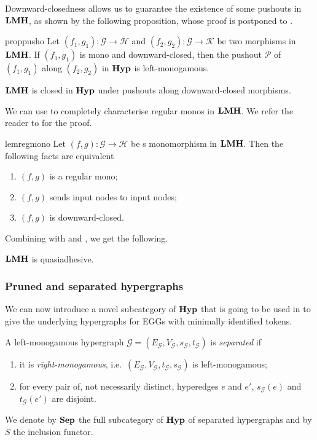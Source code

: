 \documentclass[3p]{elsarticle}
\newcommand{\catname}[1]{\textbf{\textup{#1}}}
\newcommand{\lmo}{\catname{LMH}}
\newcommand{\hyp}{\catname{Hyp}}
\newcommand{\shyp}{\catname{Sep}}
\theoremstyle{remark}
\theoremstyle{definition}
\begin{document}
Downward-closedness allows us to guarantee the existence of some pushouts in $\lmo$, as shown by the following proposition, whose proof is postponed to . 
\begin{restatable}{prop}{pusho}\label{prop:pusho}
Let $(f_1,g_1)\colon \mathcal{G}\to \mathcal{H}$ and $(f_2, g_2)\colon \mathcal{G}\to \mathcal{K}$ be two morphisms in $\lmo$. If $(f_1,g_1)$ is mono and downward-closed, then the pushout $\mathcal{P}$ of $(f_1,g_1)$ along $(f_2, g_2)$ in $\hyp$ is left-monogamous.
\end{restatable}

\begin{cor}\label{cor:pusho}
	$\lmo$ is closed in $\hyp$ under pushouts along downward-closed morphisms.
\end{cor}

We can use  to completely characterise regular monos in $\lmo$. We refer the reader to  for the proof.

\begin{restatable}{lem}{regmono}\label{lem:regmon}
	Let $(f,g)\colon \mathcal{G}\to \mathcal{H}$ be s monomorphism in $\lmo$.
Then the following facts are equivalent
 	\begin{enumerate}
		\item $(f,g)$ is a regular mono;
		\item $(f,g)$ sends input nodes to input nodes;
		\item $(f,g)$ is downward-closed.
	\end{enumerate}
\end{restatable}

Combining  with   and , we get the following.

\begin{cor}\label{cor:lmquasi}$\lmo$ is quasiadhesive.
\end{cor}


\subsubsection{Pruned and separated hypergraphs}
We can now introduce a novel  subcategory of $\hyp$ that is going to be used in  to give the underlying hypergraphs for EGGs with minimally identified tokens.

\begin{defi}  A left-monogamous hypergraph $\mathcal{G}=(E_{\mathcal{G}}, V_{\mathcal{G}}, s_{\mathcal{G}}, t_{\mathcal{G}})$ is \emph{separated} if
	\begin{enumerate}
	\item it is \emph{right-monogamous}, i.e.~$(E_{\mathcal{G}}, V_{\mathcal{G}}, t_{\mathcal{G}}, s_{\mathcal{G}})$ is left-monogamous;
	\item for every pair of, not necessarily distinct, hyperedges $e$ and $e'$,  $s_{\mathcal{G}}(e)$ and $t_{\mathcal{G}}(e')$ are disjoint.
	\end{enumerate}
We denote by $\shyp$ the full subcategory of $\hyp$ of separated hypergraphs and by $S$ the inclusion functor.
\end{defi}
\end{document}
